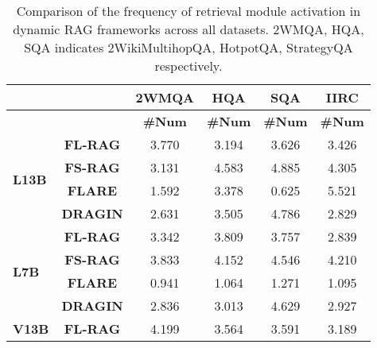 \begin{table}[t]
\caption{Comparison of the frequency of retrieval module activation in dynamic RAG frameworks across all datasets. 2WMQA, HQA, SQA indicates 2WikiMultihopQA, HotpotQA, StrategyQA respectively.}
\centering
\label{tab:efficiency}
\setlength\tabcolsep{4pt} %
\footnotesize
\begin{tabular}{lccccc}
\toprule
                                                            && \textbf{2WMQA} & \textbf{HQA} & \textbf{SQA} & \textbf{IIRC}  \\
                                          \midrule
  &\textbf{} & \textbf{\#Num}           & \textbf{\#Num}    & \textbf{\#Num}      & \textbf{\#Num} \\
 \toprule
                                            \multirow{4}{*}{\textbf{L13B}}&\textbf{FL-RAG} & 3.770                     & 3.194             & 3.626               & 3.426\\
                                            &\textbf{FS-RAG} & 3.131                    & 4.583             & 4.885               & 4.305\\
                                                                                        &\textbf{FLARE}  & 1.592                    & 3.378             & 0.625               & 5.521\\

                                            &\textbf{DRAGIN} & 2.631                    & 3.505             & 4.786               & 2.829\\
                                           \midrule
                                            \multirow{4}{*}{\textbf{L7B}}&\textbf{FL-RAG} & 3.342                    & 3.809             & 3.757               & 2.839\\
                                            &\textbf{FS-RAG} & 3.833                    & 4.152             & 4.546               & 4.210\\
                                                                                        &\textbf{FLARE}  & 0.941                    & 1.064             & 1.271               & 1.095\\

                                            &\textbf{DRAGIN} & 2.836                    & 3.013            & 4.629               & 2.927\\
                                           \midrule
                                            \multirow{4}{*}{\textbf{V13B}}&\textbf{FL-RAG} & 4.199                    & 3.564             & 3.591               & 3.189\\


\end{tabular}
\end{table}
